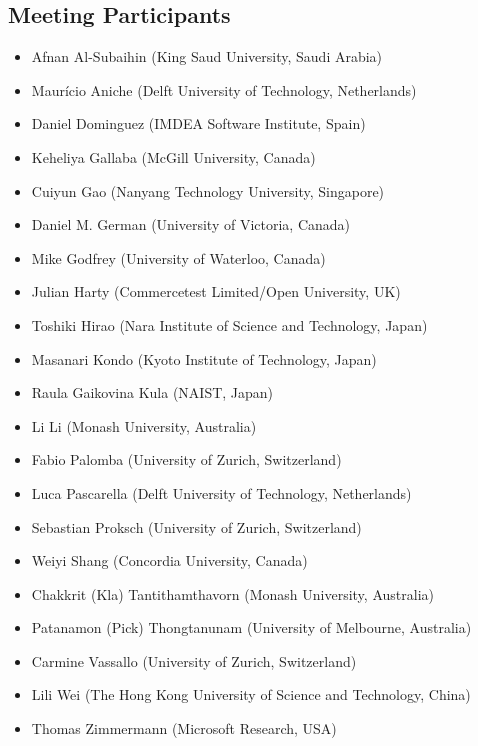 \documentclass[a4paper]{article}
\begin{document}
\subsection{Meeting Participants}

\begin{itemize}
\item Afnan Al-Subaihin (King Saud University, Saudi Arabia)
\item Maur\'icio Aniche (Delft University of Technology, Netherlands)
\item Daniel Dominguez (IMDEA Software Institute, Spain)
\item Keheliya Gallaba (McGill University, Canada)
\item Cuiyun Gao (Nanyang Technology University, Singapore)
\item Daniel M. German (University of Victoria, Canada)
\item Mike Godfrey (University of Waterloo, Canada)
\item Julian Harty (Commercetest Limited/Open University, UK)
\item Toshiki Hirao (Nara Institute of Science and Technology, Japan)
\item Masanari Kondo (Kyoto Institute of Technology, Japan)
\item Raula Gaikovina Kula (NAIST, Japan)
\item Li Li (Monash University, Australia)
\item Fabio Palomba (University of Zurich, Switzerland)
\item Luca Pascarella (Delft University of Technology, Netherlands)
\item Sebastian Proksch (University of Zurich, Switzerland)
\item Weiyi Shang (Concordia University, Canada)
\item Chakkrit (Kla) Tantithamthavorn (Monash University, Australia)
\item Patanamon (Pick) Thongtanunam (University of Melbourne, Australia)
\item Carmine Vassallo (University of Zurich, Switzerland)
\item Lili Wei (The Hong Kong University of Science and Technology, China)
\item Thomas Zimmermann (Microsoft Research, USA)
\end{itemize}
\end{document}
